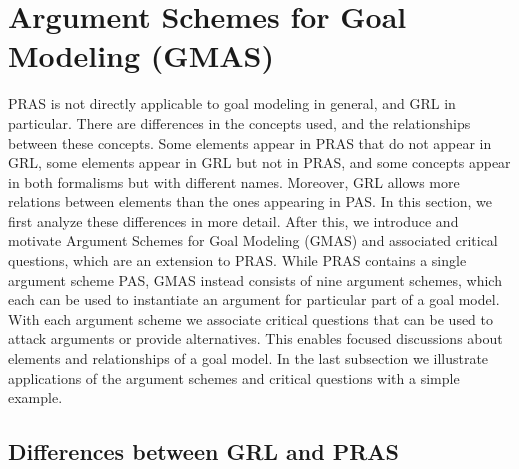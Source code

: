 \documentclass[11.5pt,two column]{llncs}
\begin{document}
\section{Argument Schemes for Goal Modeling (GMAS)}
\label{sect:gmas}

PRAS is not directly applicable to goal modeling in general, and GRL in particular. There are differences in the concepts used, and the relationships between these concepts. Some elements appear in PRAS that do not appear in GRL, some elements appear in GRL but not in PRAS, and some concepts appear in both formalisms but with different names. Moreover, GRL allows more relations between elements than the ones appearing in PAS. In this section, we first analyze these differences in more detail. After this, we introduce and motivate Argument Schemes for Goal Modeling (GMAS) and associated critical questions, which are an extension to PRAS. While PRAS contains a single argument scheme PAS, GMAS instead consists of nine argument schemes, which each can be used to instantiate an argument for particular part of a goal model. With each argument scheme we associate critical questions that can be used to attack arguments or provide alternatives. This enables focused discussions about elements and relationships of a goal model. In the last subsection we illustrate applications of the argument schemes and critical questions with a simple example.

\subsection{Differences between GRL and PRAS}
\end{document}

